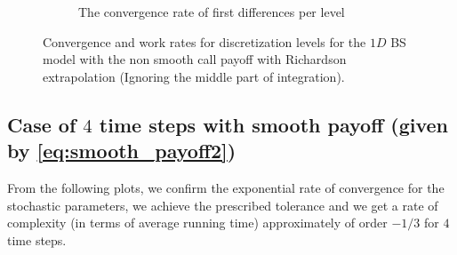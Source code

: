\documentclass[11pt]{article}
\begin{document}
\begin{figure}[!h]
\begin{subfigure}{.5\textwidth}
		\caption{ The convergence rate of first differences per level}
		\label{fig:misc_1D_BS_2_4_step_non_smooth_richardson_without_middle_sub4}
	\end{subfigure}%
	\caption{Convergence and work rates for discretization levels for the $1D$ BS model with the non smooth call payoff with Richardson extrapolation (Ignoring the middle part of integration).}
	\label{fig:misc_1D_BS_2_4_step_non_smooth_richardson_without_middle_2}
\end{figure}
\newpage


\subsection{Case of $4$ time steps with smooth payoff (given by \eqref{eq:smooth_payoff2})}

From the following plots, we confirm the exponential rate of convergence for the stochastic parameters, we achieve the prescribed tolerance and  we get a rate of complexity (in terms of average running time) approximately of order $-1/3$ for $4$ time steps.
\end{document}
